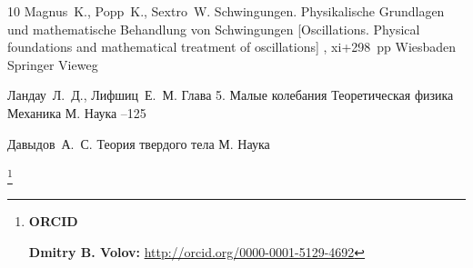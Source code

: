 \begin{thebibliography}{10}
\by Magnus~K., Popp~K.,  Sextro~W.
\book     Schwingungen. Physikalische Grundlagen und mathe\-ma\-tische Behandlung von Schwingungen \rm [Oscillations. Physical foundations and mathematical treatment of oscillations]
,
xi+298~pp
\publaddr Wiesbaden
\publ Springer Vieweg 


\by Ландау~Л.~Д., Лифшиц~Е.~М.
\paper Глава 5. Малые колебания
\inbook Теоретическая физика
\volinfo Механика
\publaddr М.
\publ  Наука
--125


\by Давыдов~А.~С.
\book Теория твердого тела
\publaddr М.
\publ  Наука


\end{thebibliography}

\RuDate

\makeentitle





\thanks{{\bf ORCID}

{\bf Dmitry B. Volov:}    \url{http://orcid.org/0000-0001-5129-4692}
}


\EngRef


